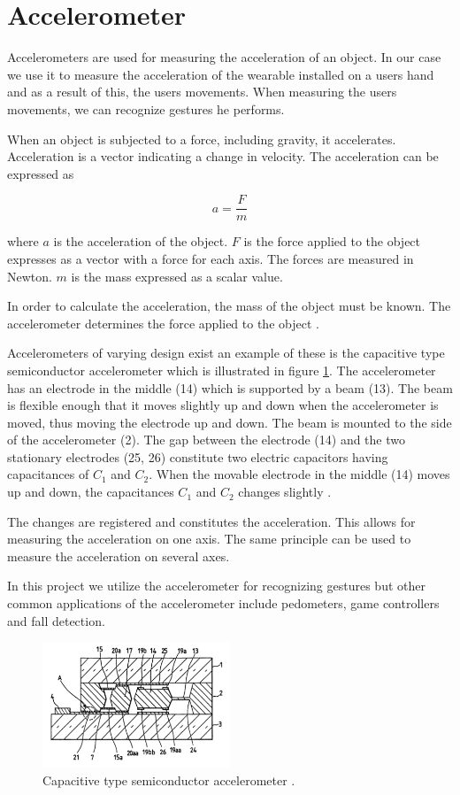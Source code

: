 \section{Accelerometer}

Accelerometers are used for measuring the acceleration of an object. In our case we use it to measure the acceleration of the wearable installed on a users hand and as a result of this, the users movements. When measuring the users movements, we can recognize gestures he performs.

When an object is subjected to a force, including gravity, it accelerates. Acceleration is a vector indicating a change in velocity. The acceleration can be expressed as

\begin{equation*}
a = \frac{F}{m}
\end{equation*}

where $a$ is the acceleration of the object. $F$ is the force applied to the object expresses as a vector with a force for each axis. The forces are measured in Newton. $m$ is the mass expressed as a scalar value.

In order to calculate the acceleration, the mass of the object must be known. The accelerometer determines the force applied to the object \cite[pp. 392-393]{Fraden:2112745}.

Accelerometers of varying design exist \cite[pp. 392-411]{Fraden:2112745} an example of these is the capacitive type semiconductor accelerometer which is illustrated in figure \ref{fig:accelerometer}. The accelerometer has an electrode in the middle (14) which is supported by a beam (13). The beam is flexible enough that it moves slightly up and down when the accelerometer is moved, thus moving the electrode up and down. The beam is mounted to the side of the accelerometer (2). The gap between the electrode (14) and the two stationary electrodes (25, 26) constitute two electric capacitors having capacitances of $C_1$ and $C_2$.
When the movable electrode in the middle (14) moves up and down, the capacitances $C_1$ and $C_2$ changes slightly \cite{kloeck1993capacitive}.

The changes are registered and constitutes the acceleration. This allows for measuring the acceleration on one axis. The same principle can be used to measure the acceleration on several axes.

In this project we utilize the accelerometer for recognizing gestures but other common applications of the accelerometer include pedometers, game controllers and fall detection.

\begin{figure}
\centering
\includegraphics[width=0.5\textwidth]{images/accelerometer}
\caption{Capacitive type semiconductor accelerometer \cite{kloeck1993capacitive}.}
\label{fig:accelerometer}
\end{figure}


